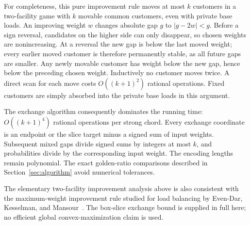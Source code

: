 \documentclass[11pt]{amsart}
\numberwithin{equation}{section}
\theoremstyle{definition}
\begin{document}
For completeness, this pure improvement rule moves at most $k$ customers
in a two-facility game with $k$ movable common customers, even with private
base loads. An improving weight $w$ changes absolute gap $g$ to
$|g-2w|<g$. Before a sign reversal, candidates on the higher side can only
disappear, so chosen weights are nonincreasing. At a reversal the new gap
is below the last moved weight; every earlier moved customer is therefore
permanently stable, as all future gaps are smaller. Any newly movable
customer has weight below the new gap, hence below the preceding chosen
weight. Inductively no customer moves twice. A direct scan for each move
costs $O((k+1)^2)$ rational operations. Fixed customers are simply absorbed
into the private base loads in this argument.

The exchange algorithm consequently dominates the running time:
$O((k+1)^4)$ rational operations per strong chord. Every exchange coordinate
is an endpoint or the slice target minus a signed sum of input weights.
Subsequent mixed gaps divide signed sums by integers at most $k$, and
probabilities divide by the corresponding input weight. The encoding
lengths remain polynomial. The exact golden-ratio comparisons described
in Section~\ref{sec:algorithm} avoid numerical tolerances.

The elementary two-facility improvement analysis above is also consistent
with the maximum-weight improvement rule studied for load balancing by
Even-Dar, Kesselman, and Mansour~\cite{evendar2007}. The box-slice exchange
bound is supplied in full here; no efficient global convex-maximization
claim is used.




\end{document}
